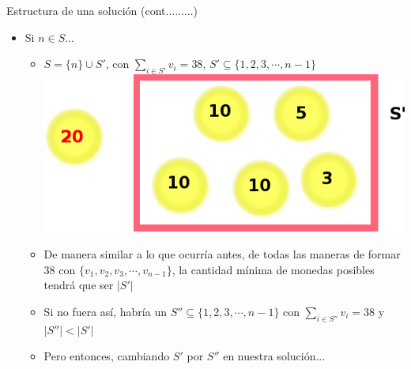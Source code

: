 \documentclass{beamer}
\begin{document}
\begin{frame}{Estructura de una solución (cont.........)}
    \begin{itemize}
    \item Si $n \in S$...
            \begin{itemize}
                 \item $S = \{n\} \cup S'$, con $\sum_{i \in S'}{v_i} = 38$, $S' \subseteq \{1,2, 3, \cdots, n -1\}$
                 \includegraphics[scale=0.4]{monedas2.png}
                 
                 \item De manera similar a lo que ocurría antes, de todas las maneras de formar $38$ con $\{ v_1, v_2, v_3, \cdots, v_{n-1} \}$, la cantidad mínima de monedas posibles tendrá que ser $|S'|$
                 \item Si no fuera así, habría un $S'' \subseteq \{1,2, 3, \cdots, n -1\}$ con $\sum_{i \in S''}{v_i} = 38$ y $|S''| < |S'|$
                 \item Pero entonces, cambiando $S'$ por $S''$ en nuestra solución... 
            \end{itemize}
    
    \end{itemize} 
\end{frame}
\end{document}
